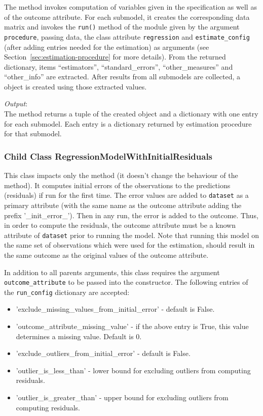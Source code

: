 The method invokes computation of variables given in the specification as well
as of the outcome attribute. For each submodel, it creates the corresponding
data matrix and invokes the \verb|run()| method of the module given by the
argument \verb|procedure|, passing data, the class attribute \verb|regression|
and \verb|estimate_config| (after adding entries needed for the estimation) as
arguments (see Section~\ref{sec:estimation-procedure} for more details). From
the returned dictionary, items ``estimators'', ``standard_errors'',
``other_measures'' and ``other_info'' are extracted.  After results from all
submodels are collected, a  object is created using those
extracted values.

{\it Output}:~\\[1mm]
The method returns a tuple of the created  object and a
dictionary with one entry for each submodel. 
Each entry is a dictionary returned by estimation procedure for that submodel.

\subsubsection{Child Class RegressionModelWithInitialResiduals}
\label{page:regression-model-with-initial-residuals}
%
This class impacts only the method  (it doesn't change the behaviour of the  method).
It computes initial errors of the observations to the predictions (residuals)
if run for the first time. The error values are added to \verb|dataset| as a primary attribute 
(with the same name as the outcome attribute adding the prefix '_init_error_').
Then in any run, the error is added to the outcome. Thus, in order to compute the residuals,
the outcome attribute must be a known attribute of \verb|dataset| prior to running the model.
Note that running this model on the same set of observations which were used for the estimation,
should result in the same outcome as the original values of the outcome attribute.

In addition to all parents arguments, this class requires the argument \verb|outcome_attribute|
to be passed into the constructor. The following entries of the \verb|run_config| dictionary are accepted:
\begin{itemize}
\item 'exclude_missing_values_from_initial_error' - default is False.
\item 'outcome_attribute_missing_value' - if the above entry is True, this value determines a missing value. Default is 0.
\item 'exclude_outliers_from_initial_error' - default is False.
\item 'outlier_is_less_than' - lower bound for excluding outliers from computing residuals.
\item 'outlier_is_greater_than' - upper bound for excluding outliers from computing residuals.
\end{itemize}


